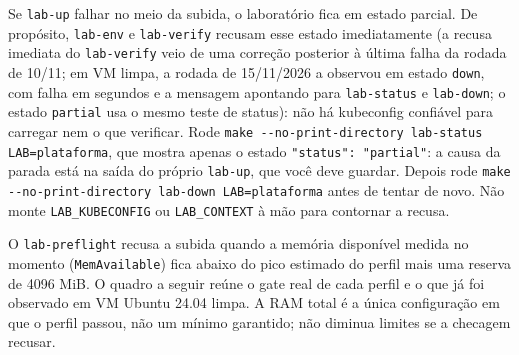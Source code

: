 \documentclass[12pt,openany,oneside,a4paper,chapter=TITLE,english,brazil]{abntex2}
\begin{document}
Se \texttt{lab-{}\allowbreak{}up} falhar no meio da subida, o laboratório fica em estado parcial. De
propósito, \texttt{lab-{}\allowbreak{}env} e \texttt{lab-{}\allowbreak{}verify} recusam esse estado imediatamente (a
recusa imediata do \texttt{lab-{}\allowbreak{}verify} veio de uma correção posterior à última falha
da rodada de 10/11; em VM limpa, a rodada de 15/11/2026 a observou em estado
\texttt{down}, com falha em segundos e a mensagem apontando para \texttt{lab-{}\allowbreak{}status} e
\texttt{lab-{}\allowbreak{}down}; o estado \texttt{partial} usa o mesmo teste de status): não há
kubeconfig confiável para carregar nem o que verificar. Rode
\texttt{make -{}\allowbreak{}-{}\allowbreak{}no-{}\allowbreak{}print-{}\allowbreak{}directory lab-{}\allowbreak{}status LAB=\allowbreak{}plataforma}, que mostra apenas o
estado \texttt{"status":\allowbreak{} "partial"}: a causa da parada está na saída do próprio
\texttt{lab-{}\allowbreak{}up}, que você deve guardar. Depois rode
\texttt{make -{}\allowbreak{}-{}\allowbreak{}no-{}\allowbreak{}print-{}\allowbreak{}directory lab-{}\allowbreak{}down LAB=\allowbreak{}plataforma} antes de tentar de novo. Não monte \texttt{LAB\_\allowbreak{}KUBECONFIG} ou \texttt{LAB\_\allowbreak{}CONTEXT} à mão para contornar a recusa.

O \texttt{lab-{}\allowbreak{}preflight} recusa a subida quando a memória disponível medida no
momento (\texttt{Mem\allowbreak{}Available}) fica abaixo do pico estimado do perfil mais uma
reserva de 4096 MiB. O quadro a seguir reúne o gate real de cada perfil e o que
já foi observado em VM Ubuntu 24.04 limpa. A RAM total é a única configuração
em que o perfil passou, não um mínimo garantido; não diminua limites se a
checagem recusar.
\end{document}
